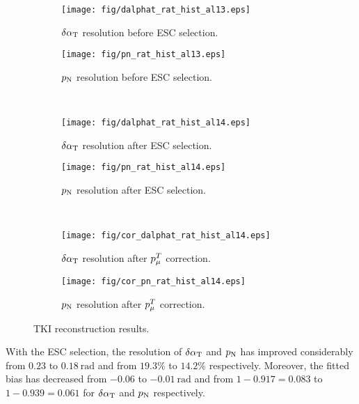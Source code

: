         \begin{figure}[!htb] 
           \centering
           \begin{subfigure}{0.45\textwidth}
                \texttt{[image: fig/dalphat\_rat\_hist\_al13.eps]}
                \caption{$\delta\alpha_\textrm{T}$ resolution before ESC selection.}
                \label{fig:dat-res-bfESC}
           \end{subfigure}
           \begin{subfigure}{0.45\textwidth}
                \texttt{[image: fig/pn\_rat\_hist\_al13.eps]}
                \caption{$p_\textrm{N}$ resolution before ESC selection.}
                \label{fig:pn-res-bfESC}
           \end{subfigure}
           \\
            \begin{subfigure}{0.45\textwidth}
                \texttt{[image: fig/dalphat\_rat\_hist\_al14.eps]}
                \caption{$\delta\alpha_\textrm{T}$ resolution after ESC selection.}
                \label{fig:dat-res-afESC}
           \end{subfigure}
           \begin{subfigure}{0.45\textwidth}
                \texttt{[image: fig/pn\_rat\_hist\_al14.eps]}
                \caption{$p_\textrm{N}$ resolution after ESC selection.}
                \label{fig:pn-res-afESC}
           \end{subfigure}
           \\
            \begin{subfigure}{0.45\textwidth}
                \texttt{[image: fig/cor\_dalphat\_rat\_hist\_al14.eps]}
                \caption{$\delta\alpha_\textrm{T}$ resolution after $p_{\mu}^T$ correction.}
                \label{fig:0pi-cordat}
           \end{subfigure}
           \begin{subfigure}{0.45\textwidth}
                \texttt{[image: fig/cor\_pn\_rat\_hist\_al14.eps]}
                \caption{$p_\textrm{N}$ resolution after $p_{\mu}^T$ correction.}
                \label{fig:0pi-corpn}
           \end{subfigure}
           \caption{TKI reconstruction results.}
           \label{fig:tki-res-bfafESC}
        \end{figure}

        With the ESC selection, the resolution of $\delta\alpha_\textrm{T}$ and $p_\textrm{N}$ has improved considerably from $0.23$ to $0.18~\textrm{rad}$ and from $19.3\%$ to $14.2\%$ respectively. Moreover, the fitted bias has decreased from $-0.06$ to $-0.01~\textrm{rad}$ and from $1-0.917=0.083$ to $1-0.939=0.061$ for $\delta\alpha_\textrm{T}$ and $p_\textrm{N}$ respectively.  

